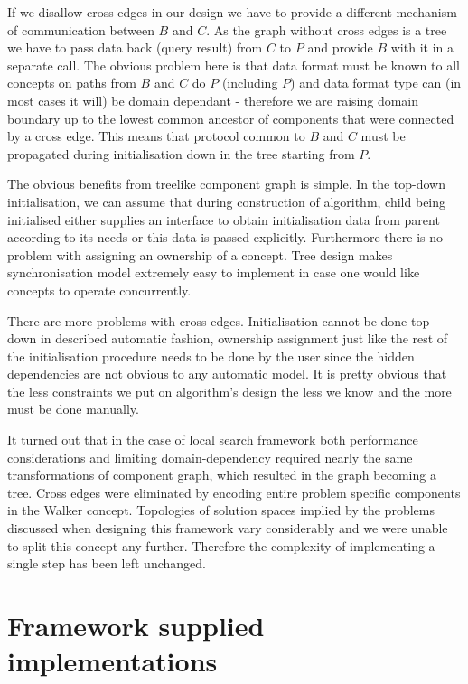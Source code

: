 If we disallow cross edges in our design we have to provide a different mechanism
of communication between $B$ and $C$. As the graph without cross edges is a
tree we have to pass data back (query result) from $C$ to $P$ and provide $B$
with it in a separate call. The obvious problem here is that data format must be
known to all concepts on paths from $B$ and $C$ do $P$ (including $P$) and data
format type can (in most cases it will) be domain dependant - therefore we are
raising domain boundary up to the lowest common ancestor of components that were
connected by a cross edge. This means that protocol common to $B$ and $C$
must be propagated during initialisation down in the tree starting
from $P$.

The obvious benefits from treelike component graph is simple. In the top-down
initialisation, we can assume that during construction of algorithm, child being
initialised either supplies an interface to obtain initialisation data from parent
according to its needs or this data is passed explicitly. Furthermore there is
no problem with assigning an ownership of a concept. Tree design makes
synchronisation model extremely easy to implement in case one would like
concepts to operate concurrently.

There are more problems with cross edges. Initialisation cannot be done
top-down in described automatic fashion, ownership assignment just like the
rest of the initialisation procedure needs to be done by the user since the hidden
dependencies are not obvious to any automatic model. It is pretty obvious that
the less constraints we put on algorithm's design the less we know and the more
must be done manually.

It turned out that in the case of local search framework both performance
considerations and limiting domain-dependency required nearly the same
transformations of component graph, which resulted in the graph becoming a
tree. Cross edges were eliminated by encoding entire problem specific
components in the Walker concept. Topologies of solution spaces implied by
the problems discussed when designing this framework vary considerably and we were
unable to split this concept any further. Therefore the complexity of implementing
a single step has been left unchanged.

\section{Framework supplied implementations}


